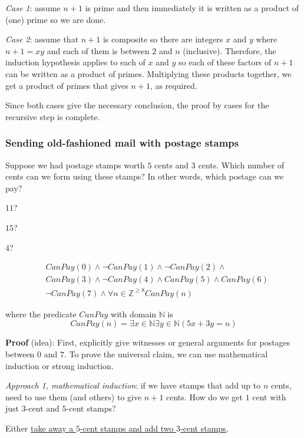 \documentclass[12pt, oneside]{article}
\begin{document}
{\it Case 1}: assume $n+1$ is prime and then immediately it is written as a product
of (one) prime so we are done.  

{\it Case 2}: assume that $n+1$ is composite
so there are integers $x$ and $y$ where $n+1 = xy$ and each of them is between $2$ and $n$
(inclusive).  Therefore, the induction hypothesis applies to each of $x$ and $y$ so each 
of these factors of $n+1$ can be written as a product of primes.  Multiplying these products together, 
we get a product of primes that gives $n+1$, as required. 

Since both cases give the necessary
conclusion, the proof by cases for the recursive step is complete. \subsubsection*{Sending old-fashioned mail with postage stamps}


Suppose we had postage stamps worth $5$ cents and $3$ cents.
Which number of cents can we form using these stamps?
In other words, which postage can we pay?

$11$? 

$15$? 


$4$?



\begin{align*}
    &CanPay(0) \land \lnot CanPay(1) \land \lnot CanPay(2) \land \\
    &CanPay(3) \land \lnot CanPay(4) \land CanPay(5) \land CanPay(6) \\
    &\lnot CanPay(7) \land \forall n \in \mathbb{Z}^{\geq 8} CanPay(n)
\end{align*}

where the predicate $CanPay$ with domain $\mathbb{N}$ is
\[
    CanPay(n) = \exists x \in \mathbb{N} \exists y \in \mathbb{N}  ( 5x+3y = n)
\]


{\bf Proof} (idea): First, explicitly give witnesses or general arguments
for postages between $0$ and $7$. 
To prove the universal claim, we can use mathematical induction or strong induction.

{\it Approach 1, mathematical induction}: if we have
stamps that add up to $n$ cents, need to use them (and others)
to give $n+1$ cents. How do we get $1$ cent with just $3$-cent
and $5$-cent stamps?

\vspace{-10pt}
Either \underline{take away a $5$-cent stamps and add two $3$-cent stamps},
\end{document}

